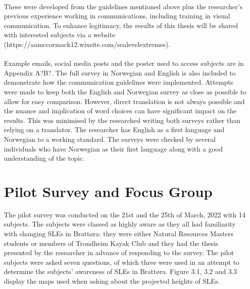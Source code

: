 \paragraph{}
These were developed from the guidelines mentioned above plus the researcher's previous experience working in communications, including training in visual communication. To enhance legitimacy, the results of this thesis will be shared with interested subjects via a website (https://aamccormack12.wixsite.com/sealevelextremes).
\paragraph{}
Example emails, social media posts and the poster used to access subjects are in Appendix A?B?. The full survey in Norwegian and English is also included to demonstrate how the communication guidelines were implemented. Attempts were made to keep both the English and Norwegian survey as close as possible to allow for easy comparison. However, direct translation is not always possible and the nuance and implication of word choices can have significant impact on the results. This was minimised by the researched writing both surveys rather than relying on a translator. The researcher has English as a first language and Norwegian to a working standard. The surveys were checked by several individuals who have Norwegian as their first language along with a good understanding of the topic.


\section{Pilot Survey and Focus Group}

The pilot survey was conducted on the 21st and the 25th of March, 2022 with 14 subjects. The subjects were classed as highly aware as they all had familiarity with changing SLEs in Brattøra: they were either Natural Resources Masters students or members of Trondheim Kayak Club and they had the thesis presented by the researcher in advance of responding to the survey. The pilot subjects were asked seven questions, of which three were used in an attempt to determine the subjects' awareness of SLEs in Brattøra. Figure 3.1, 3.2 and 3.3 display the maps used when asking about the projected heights of SLEs.

